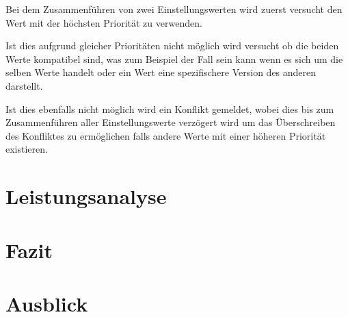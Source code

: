 \documentclass[german,proseminar,hyperref,utf8]{zihpub}
\begin{document}
    Bei dem Zusammenführen von zwei Einstellungswerten wird zuerst versucht den Wert mit der höchsten
    Priorität zu verwenden.

    Ist dies aufgrund gleicher Prioritäten nicht möglich wird versucht ob die beiden Werte kompatibel
    sind, was zum Beispiel der Fall sein kann wenn es sich um die selben Werte handelt oder ein
    Wert eine spezifischere Version des anderen darstellt.

    Ist dies ebenfalls nicht möglich wird ein Konflikt gemeldet, wobei dies bis zum Zusammenführen
    aller Einstellungswerte verzögert wird um das Überschreiben des Konfliktes zu ermöglichen falls
    andere Werte mit einer höheren Priorität existieren.

    \section{Leistungsanalyse}


    \section{Fazit}


    \section{Ausblick}

    \newpage
    \listoffigures
\end{document}

